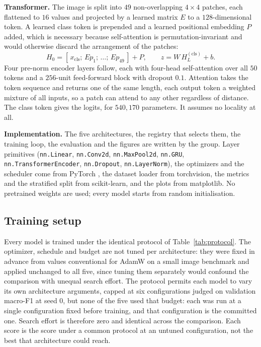 \textbf{Transformer.} The image is split into $49$ non-overlapping $4 \times 4$ patches, each
flattened to $16$ values and projected by a learned matrix $E$ to a $128$-dimensional token. A
learned class token is prepended and a learned positional embedding $P$ added, which is necessary
because self-attention is permutation-invariant and would otherwise discard the arrangement of
the patches:
\begin{equation}
    H_0 = [\,x_{\mathrm{cls}};\, E p_1;\, \dots;\, E p_{49}\,] + P, \qquad
    z = W\,H_L^{(\mathrm{cls})} + b.
\end{equation}
Four pre-norm encoder layers \cite{vaswani2017attention} follow, each with four-head
self-attention over all $50$ tokens and a $256$-unit feed-forward block with dropout $0.1$.
Attention takes the token sequence and returns one of the same length, each output token a
weighted mixture of all inputs, so a patch can attend to any other regardless of distance. The
class token gives the logits, for $540{,}170$ parameters. It assumes no locality at all.

\textbf{Implementation.} The five architectures, the registry that selects them, the training
loop, the evaluation and the figures are written by the group. Layer primitives
(\texttt{nn.Linear}, \texttt{nn.Conv2d}, \texttt{nn.MaxPool2d}, \texttt{nn.GRU},
\texttt{nn.TransformerEncoder}, \texttt{nn.Dropout}, \texttt{nn.LayerNorm}), the optimizers and
the scheduler come from PyTorch \cite{paszke2019pytorch}, the dataset loader from torchvision,
the metrics and the stratified split from scikit-learn, and the plots from matplotlib. No
pretrained weights are used; every model starts from random initialisation.

\subsection{Training setup}
\label{subsec:methodology-3}

Every model is trained under the identical protocol of Table~\ref{tab:protocol}. The optimizer,
schedule and budget are not tuned per architecture: they were fixed in advance from values
conventional for AdamW \cite{loshchilov2019adamw} on a small image benchmark and applied
unchanged to all five, since tuning them separately would confound the comparison with unequal
search effort. The protocol permits each model to vary its own architecture arguments, capped at
six configurations judged on validation macro-F1 at seed 0, but none of the five used that
budget: each was run at a single configuration fixed before training, and that configuration is
the committed one. Search effort is therefore zero and identical across the comparison. Each
score is the score under a common protocol at an untuned configuration, not the best that
architecture could reach.

